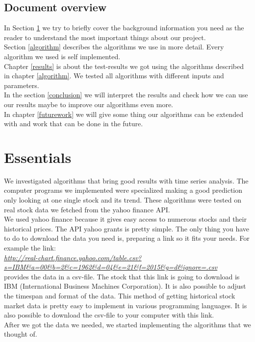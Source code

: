 \documentclass[conference]{IEEEtran}
\begin{document}
\subsection{Document overview}
In Section \ref{essentials} we try to briefly cover the background information you need as the reader to understand the most important things about our project.
\\
Section \ref{algorithm} describes the algorithms we use in more detail. Every algorithm we used is self implemented. 
\\
Chapter \ref{results} is about the test-results we got using the algorithms described in chapter \ref{algorithm}. We tested all algorithms with different inputs and parameters.
\\
In the section \ref{conclusion} we will interpret the results and check how we can use our results maybe to improve our algorithms even more.
\\
In chapter \ref{futurework} we will give some thing our algorithms can be extended with and work that can be done in the future.


\section{Essentials}
\label{essentials}

We investigated algorithms that bring good results with time series analysis. The computer programs we implemented were specialized  making a good prediction only looking at one single stock and its trend. These algorithms were tested on real stock data we fetched from the yahoo finance API. 
\\
We used yahoo finance because it gives easy access to numerous stocks and their historical prices. The API yahoo grants is pretty simple. The only thing you have to do to download the data you need is, preparing a link so it fits your needs. For example the link: 
\\
\textit{\url{http://real-chart.finance.yahoo.com/table.csv?s=IBM&a=00&b=2&c=1962&d=04&e=21&f=2015&g=d&ignore=.csv}}
\\
 provides the data in a csv-file. The stock that this link is going to download is IBM (International Business Machines Corporation). It is also possible to adjust the timespan and format of the data. 
This method of getting historical stock market data is pretty easy to implement in various programming languages. It is also possible to download the csv-file to your computer with this link.
\\
After we got the data we needed, we started implementing the algorithms that we thought of. 
\end{document}
